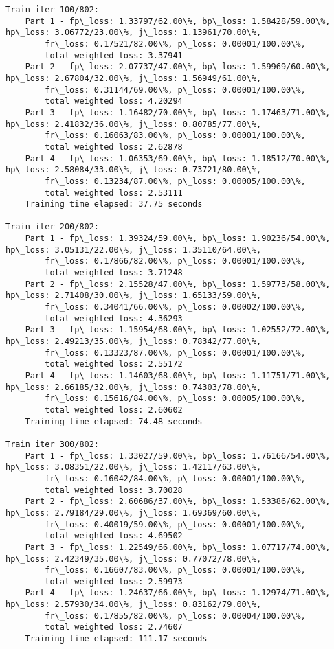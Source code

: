 \documentclass[11pt]{article}
\begin{document}
\begin{Verbatim}[commandchars=\\\{\}]
Train iter 100/802:
	Part 1 - fp\_loss: 1.33797/62.00\%, bp\_loss: 1.58428/59.00\%, hp\_loss: 3.06772/23.00\%, j\_loss: 1.13961/70.00\%, 
		fr\_loss: 0.17521/82.00\%, p\_loss: 0.00001/100.00\%, 
		total weighted loss: 3.37941
	Part 2 - fp\_loss: 2.07737/47.00\%, bp\_loss: 1.59969/60.00\%, hp\_loss: 2.67804/32.00\%, j\_loss: 1.56949/61.00\%, 
		fr\_loss: 0.31144/69.00\%, p\_loss: 0.00001/100.00\%, 
		total weighted loss: 4.20294
	Part 3 - fp\_loss: 1.16482/70.00\%, bp\_loss: 1.17463/71.00\%, hp\_loss: 2.41832/36.00\%, j\_loss: 0.80785/77.00\%, 
		fr\_loss: 0.16063/83.00\%, p\_loss: 0.00001/100.00\%, 
		total weighted loss: 2.62878
	Part 4 - fp\_loss: 1.06353/69.00\%, bp\_loss: 1.18512/70.00\%, hp\_loss: 2.58084/33.00\%, j\_loss: 0.73721/80.00\%, 
		fr\_loss: 0.13234/87.00\%, p\_loss: 0.00005/100.00\%, 
		total weighted loss: 2.53111
	Training time elapsed: 37.75 seconds

Train iter 200/802:
	Part 1 - fp\_loss: 1.39324/59.00\%, bp\_loss: 1.90236/54.00\%, hp\_loss: 3.05131/22.00\%, j\_loss: 1.35110/64.00\%, 
		fr\_loss: 0.17866/82.00\%, p\_loss: 0.00001/100.00\%, 
		total weighted loss: 3.71248
	Part 2 - fp\_loss: 2.15528/47.00\%, bp\_loss: 1.59773/58.00\%, hp\_loss: 2.71408/30.00\%, j\_loss: 1.65133/59.00\%, 
		fr\_loss: 0.34041/66.00\%, p\_loss: 0.00002/100.00\%, 
		total weighted loss: 4.36293
	Part 3 - fp\_loss: 1.15954/68.00\%, bp\_loss: 1.02552/72.00\%, hp\_loss: 2.49213/35.00\%, j\_loss: 0.78342/77.00\%, 
		fr\_loss: 0.13323/87.00\%, p\_loss: 0.00001/100.00\%, 
		total weighted loss: 2.55172
	Part 4 - fp\_loss: 1.14603/68.00\%, bp\_loss: 1.11751/71.00\%, hp\_loss: 2.66185/32.00\%, j\_loss: 0.74303/78.00\%, 
		fr\_loss: 0.15616/84.00\%, p\_loss: 0.00005/100.00\%, 
		total weighted loss: 2.60602
	Training time elapsed: 74.48 seconds

Train iter 300/802:
	Part 1 - fp\_loss: 1.33027/59.00\%, bp\_loss: 1.76166/54.00\%, hp\_loss: 3.08351/22.00\%, j\_loss: 1.42117/63.00\%, 
		fr\_loss: 0.16042/84.00\%, p\_loss: 0.00001/100.00\%, 
		total weighted loss: 3.70028
	Part 2 - fp\_loss: 2.60686/37.00\%, bp\_loss: 1.53386/62.00\%, hp\_loss: 2.79184/29.00\%, j\_loss: 1.69369/60.00\%, 
		fr\_loss: 0.40019/59.00\%, p\_loss: 0.00001/100.00\%, 
		total weighted loss: 4.69502
	Part 3 - fp\_loss: 1.22549/66.00\%, bp\_loss: 1.07717/74.00\%, hp\_loss: 2.42349/35.00\%, j\_loss: 0.77072/78.00\%, 
		fr\_loss: 0.16607/83.00\%, p\_loss: 0.00001/100.00\%, 
		total weighted loss: 2.59973
	Part 4 - fp\_loss: 1.24637/66.00\%, bp\_loss: 1.12974/71.00\%, hp\_loss: 2.57930/34.00\%, j\_loss: 0.83162/79.00\%, 
		fr\_loss: 0.17855/82.00\%, p\_loss: 0.00004/100.00\%, 
		total weighted loss: 2.74607
	Training time elapsed: 111.17 seconds


\end{Verbatim}
\end{document}
